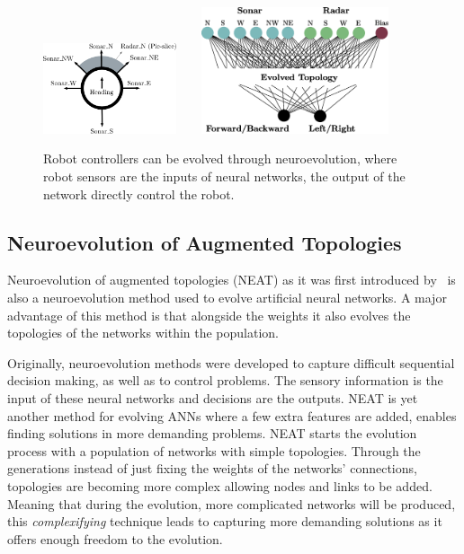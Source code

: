 \begin{figure}[t!]
\centering
\includegraphics[width=0.35\textwidth]{../Figures/Misc/RobotMaze.eps}\  \    \  \    
\includegraphics[width=0.49\textwidth]{../Figures/Misc/RobotMazeNetwork.eps}
\caption{Robot controllers can be evolved through neuroevolution, where robot sensors are the inputs of neural networks, the output of the network directly control the robot.}
\label{fig:robotExample}
\end{figure}


\subsection{Neuroevolution of Augmented Topologies}
\label{NEAT}

Neuroevolution of augmented topologies (NEAT) as it was first introduced by~\citep{stanley2002evolving} is also a neuroevolution method used to evolve artificial neural networks. A major advantage of this method is that alongside the weights it also evolves the topologies of the networks within the population.

Originally, neuroevolution methods were developed to capture difficult sequential decision making, as well as to control problems. The sensory information is the input of these neural networks and decisions are the outputs. NEAT is yet another method for evolving ANNs where a few extra features are added, enables finding solutions in more demanding problems. NEAT starts the evolution process with a population of networks with simple topologies. Through the generations instead of just fixing the weights of the networks' connections, topologies are becoming more complex allowing nodes and links to be added. Meaning that during the evolution, more complicated networks will be produced, this \emph{complexifying} technique leads to capturing more demanding solutions as it offers enough freedom to the evolution.

